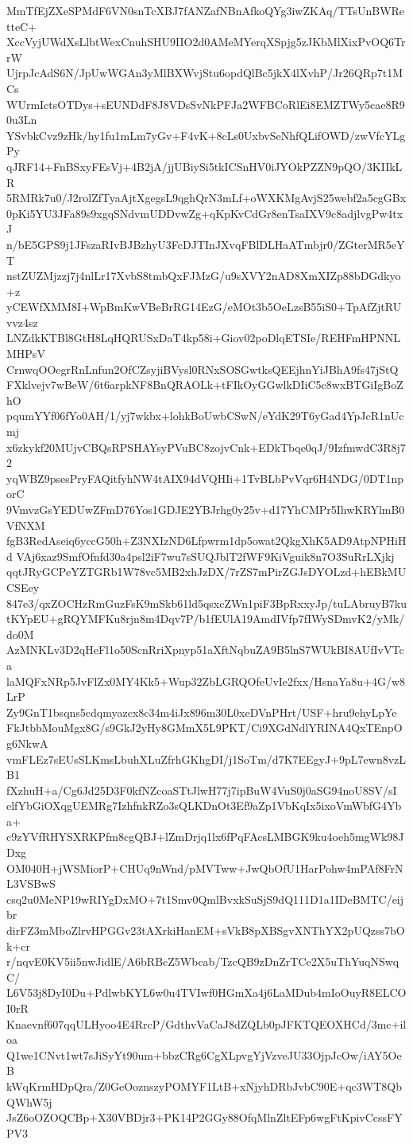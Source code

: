 MmTfEjZXeSPMdF6VN0snTcXBJ7fANZafNBnAfkoQYg3iwZKAq/TTsUnBWRetteC+
XccVyjUWdXsLlbtWexCnuhSHU9IIO2d0AMeMYerqXSpjg5zJKbMlXixPvOQ6TrrW
UjrpJcAdS6N/JpUwWGAn3yMlBXWvjStu6opdQlBc5jkX4lXvhP/Jr26QRp7t1MCs
WUrmIctsOTDys+sEUNDdF8J8VDsSvNkPFJa2WFBCoRlEi8EMZTWy5cae8R90u3Ln
YSvbkCvz9zHk/hy1fu1mLm7yGv+F4vK+8cLs0UxbvSeNhfQLifOWD/zwVfcYLgPy
qJRF14+FnBSxyFEsVj+4B2jA/jjUBiySi5tkICSnHV0iJYOkPZZN9pQO/3KIIkLR
5RMRk7u0/J2rolZfTyaAjtXgegsL9qghQrN3mLf+oWXKMgAvjS25webf2a5cgGBx
0pKi5YU3JFa89s9xgqSNdvmUDDvwZg+qKpKvCdGr8enTsaIXV9c8adjlvgPw4txJ
n/bE5GPS9j1JFszaRIvBJBzhyU3FcDJTInJXvqFBlDLHaATmbjr0/ZGterMR5eYT
nstZUZMjzzj7j4nlLr17XvbS8tmbQxFJMzG/u9sXVY2nAD8XmXIZp88bDGdkyo+z
yCEWfXMM8I+WpBmKwVBeBrRG14EzG/eMOt3b5OeLzsB55iS0+TpAfZjtRUvvz4sz
LNZdkKTBl8GtH8LqHQRUSxDaT4kp58i+Giov02poDlqETSIe/REHFmHPNNLMHPsV
CrnwqOOegrRnLnfun2OfCZsyjiBVysl0RNxSOSGwtksQEEjhnYiJBhA9fs47jStQ
FXklvejv7wBeW/6t6arpkNF8BnQRAOLk+tFIkOyGGwlkDIiC5c8wxBTGiIgBoZhO
pqumYYf06fYo0AH/1/yj7wkbx+lohkBoUwbCSwN/eYdK29T6yGad4YpJcR1nUcmj
x6zkykf20MUjvCBQsRPSHAYsyPVuBC8zojvCnk+EDkTbqe0qJ/9IzfmwdC3R8j72
yqWBZ9psesPryFAQitfyhNW4tAIX94dVQHIi+1TvBLbPvVqr6H4NDG/0DT1nporC
9VmvzGsYEDUwZFmD76Yos1GDJE2YBJrhg0y25v+d17YhCMPr5IhwKRYlmB0VfNXM
fgB3RedAseiq6yccG50h+Z3NXIzND6Lfpwrm1dp5owat2QkgXhK5AD9AtpNPHiHd
VAj6xaz9SmfOfnfd30a4psl2iF7wu7sSUQJblT2fWF9KiVguik8n7O3SuRrLXjkj
qqtJRyGCPeYZTGRb1W78vc5MB2xhJzDX/7rZS7mPirZGJsDYOLzd+hEBkMUCSEey
847e3/qxZOCHzRmGuzFsK9mSkb61ld5qsxcZWn1piF3BpRxxyJp/tuLAbruyB7ku
tKYpEU+gRQYMFKu8rjn8m4Dqv7P/b1fEUlA19AmdIVfp7fIWySDmvK2/yMk/do0M
AzMNKLv3D2qHeFl1o50ScnRriXpnyp51aXftNqbuZA9B5lnS7WUkBI8AUfIvVTca
laMQFxNRp5JvFlZx0MY4Kk5+Wup32ZbLGRQOfeUvIe2fxx/HsnaYa8u+4G/w8LrP
Zy9GnT1bsqns5cdqmyazcx8c34m4iJx896m30L0xeDVnPHrt/USF+hru9ehyLpYe
FkJtbbMouMgx8G/s9GkJ2yHy8GMmX5L9PKT/Ci9XGdNdlYRINA4QxTEnpOg6NkwA
vmFLEz7sEUsSLKmsLbuhXLuZfrhGKhgDI/j1SoTm/d7K7EEgyJ+9pL7ewn8vzLB1
fXzhuH+a/Cg6Jd25D3F0kfNZcoaSTtJlwH77j7ipBuW4VuS0j0aSG94noU8SV/sI
elfYbGiOXqgUEMRg7IzhfnkRZo3sQLKDnOt3Ef9aZp1VbKqIx5ixoVmWbfG4Yba+
c9zYVfRHYSXRKPfm8cgQBJ+lZmDrjq1lx6fPqFAcsLMBGK9ku4oeh5mgWk98JDxg
OM040H+jWSMiorP+CHUq9nWnd/pMVTww+JwQbOfU1HarPohw4mPAf8FrNL3VSBwS
csq2u0MeNP19wRIYgDxMO+7t1Smv0QmlBvxkSuSjS9dQ111D1a1IDeBMTC/eijbr
dirFZ3mMboZlrvHPGGv23tAXrkiHanEM+sVkB8pXBSgvXNThYX2pUQzss7bOk+cr
r/nqvE0KV5ii5nwJidlE/A6bRBcZ5Wbcab/TzcQB9zDnZrTCe2X5uThYuqNSwqC/
L6V53j8DyI0Du+PdlwbKYL6w0u4TVIwf0HGmXa4j6LaMDub4mIoOuyR8ELCOI0rR
Knaevnf607qqULHyoo4E4RrcP/GdthvVaCaJ8dZQLb0pJFKTQEOXHCd/3mc+iloa
Q1we1CNvt1wt7sJiSyYt90um+bbzCRg6CgXLpvgYjVzveJU33OjpJcOw/iAY5OeB
kWqKrmHDpQra/Z0GeOoznszyPOMYF1LtB+xNjyhDRbJvbC90E+qc3WT8QbQWhW5j
JsZ6oOZOQCBp+X30VBDjr3+PK14P2GGy88OfqMlnZltEFp6wgFtKpivCcssFYPV3
